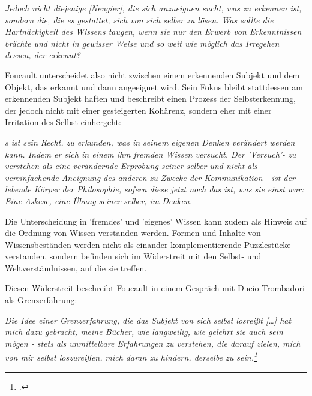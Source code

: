 \begin{myenv}
  \textit{Jedoch \glqq [...] nicht diejenige [Neugier], die sich anzueignen
  sucht, was zu erkennen ist, sondern die, die es gestattet, sich von sich
selber zu lösen. Was sollte die Hartnäckigkeit des Wissens taugen, wenn sie nur
den Erwerb von Erkenntnissen brächte und nicht in gewisser Weise und so weit
wie möglich das Irregehen dessen, der erkennt?\grqq} \footnotemark
{}
\end{myenv}

Foucault unterscheidet also nicht zwischen einem erkennenden Subjekt und dem Objekt, das erkannt und dann angeeignet wird. Sein Fokus bleibt stattdessen am erkennenden Subjekt haften und beschreibt einen Prozess der Selbsterkennung, der jedoch nicht mit einer gesteigerten Kohärenz, sondern eher mit einer Irritation des Selbst einhergeht: 

\begin{myenv}
  \textit{ 
    \glqq [E]s ist sein Recht, zu erkunden, was in seinem eigenen Denken verändert
    werden kann. Indem er sich in einem ihm fremden Wissen versucht. Der
    'Versuch'- zu verstehen als eine verändernde Erprobung seiner selber und 
    nicht als vereinfachende Aneignung des anderen zu Zwecke der Kommunikation
    - ist der lebende Körper der Philosophie, sofern diese jetzt noch das ist,
    was sie einst war: Eine Askese, eine Übung seiner selber, im Denken.\grqq\footnotemark
  }

\end{myenv}

Die Unterscheidung in 'fremdes' und 'eigenes' 
Wissen kann zudem als Hinweis auf die Ordnung von Wissen verstanden werden. Formen und Inhalte von Wissensbeständen werden nicht als einander komplementierende Puzzlestücke verstanden, sondern befinden sich im Widerstreit mit den Selbst- und Weltverständnissen, auf die sie treffen.

Diesen Widerstreit beschreibt Foucault in einem Gespräch mit Ducio Trombadori als Grenzerfahrung:

\begin{myenv}
  \textit{\glqq Die Idee einer Grenzerfahrung, die das Subjekt von sich selbst
  losreißt […] hat mich dazu gebracht, meine Bücher, wie langweilig, wie
gelehrt sie auch sein mögen - stets als unmittelbare Erfahrungen zu verstehen,
die darauf zielen, mich von mir selbst loszureißen, mich daran zu hindern,
derselbe zu sein.\grqq\footnotemark \footcitetext{foucinterview}} 
\end{myenv} 

